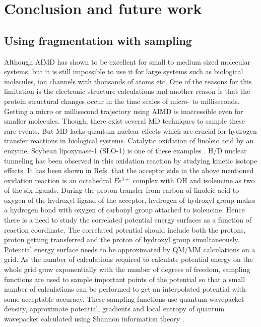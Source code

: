 \chapter{Conclusion and future work}

\section{Using fragmentation with sampling}
{\label {samplingSection}}
Although AIMD has shown to be excellent for small to medium sized molecular
systems, but it is still impossible to use it for large systems such as biological
molecules, ion channels with thousands of atoms etc. One of the reasons for this limitation
is the electronic structure calculations and another reason is that the protein
structural changes occur in the time scales of micro- to milliseconds. Getting a micro
or millisecond trajectory using AIMD is inaccessible even for smaller molecules. Though,
there exist several MD techniques to sample these rare events. But MD lacks quantum
nuclear effects which are crucial for hydrogen transfer reactions in biological systems.
Catalytic oxidation of linoleic acid by an enzyme, Soybean lipoxynase-1 (SLO-1) is one
of these examples \cite{SLO-rare-isotopes, SLO1-Rareevents}. H/D nuclear tunneling has
been observed in this oxidation reaction by studying kinetic isotope effects. It has
been shown in Refs.  that the acceptor side in the above
mentioned oxidation reaction is an octahedral $Fe^{3+}$ complex with OH and isoleucine
as two of the six ligands. During the proton transfer from carbon of linoleic acid to
oxygen of the hydroxyl ligand of the acceptor, hydrogen of hydroxyl group makes a
hydrogen bond with oxygen of carbonyl group attached to isoleucine. Hence there is a
need to study the correlated potential energy surfaces as a function of reaction
coordinate. The correlated potential should include both the protons, proton getting
transferred and the proton of hydroxyl group simultaneously.
Potential energy surface needs to be approximated by QM/MM calculations on a grid.
As the number of calculations required to calculate potential energy on the whole
grid grow exponentially with the number of degrees of freedom, sampling functions
are used to sample important points
of the potential so that a small number of calculations can be performed to get an
interpolated potential with some acceptable accuracy. These sampling functions use
quantum wavepacket density, approximate potential, gradients and local entropy
of quantum wavepacket calculated using Shannon information theory \cite{shannonIsoprene}.

